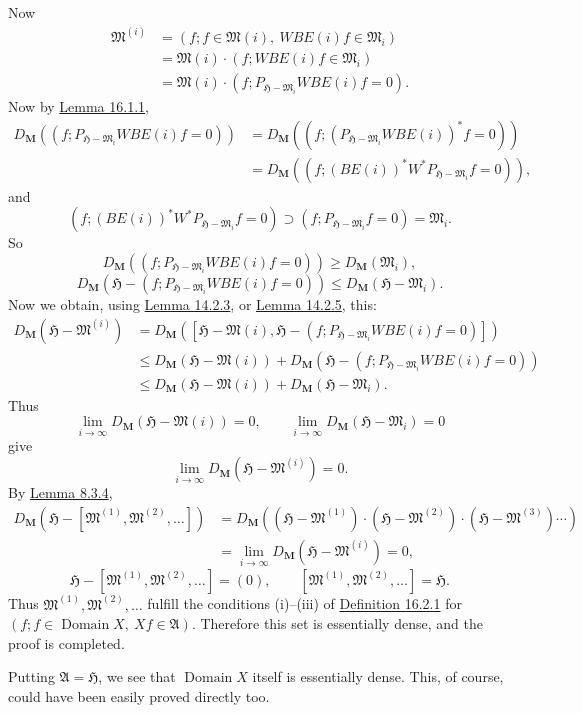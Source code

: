 \documentclass[12pt,b5paper,twoside]{article}
\newcommand{\Hspace}{\mathfrak H}
\newcommand{\M}{\mathbf M}
\newcommand{\defref}[1]{\hyperref[def:#1]{Definition #1}}
\newcommand{\lemref}[1]{\hyperref[lem:#1]{Lemma #1}}
\begin{document}
Now
\[
\begin{aligned}
\mathfrak M^{(i)}
 &=(f;f\in\mathfrak M(i),\ WBE(i)f\in\mathfrak M_i)\\
 &=\mathfrak M(i)\cdot(f;WBE(i)f\in\mathfrak M_i)\\
 &=\mathfrak M(i)\cdot
   (f;P_{\Hspace-\mathfrak M_i}WBE(i)f=0).
\end{aligned}
\]
Now by \lemref{16.1.1},
\[
\begin{aligned}
D_{\M}((f;P_{\Hspace-\mathfrak M_i}WBE(i)f=0))
 &=D_{\M}((f;(P_{\Hspace-\mathfrak M_i}WBE(i))^*f=0))\\
 &=D_{\M}((f;(BE(i))^*W^*P_{\Hspace-\mathfrak M_i}f=0)),
\end{aligned}
\]
and
\[
(f;(BE(i))^*W^*P_{\Hspace-\mathfrak M_i}f=0)
\supset(f;P_{\Hspace-\mathfrak M_i}f=0)=\mathfrak M_i.
\]
So
\[
D_{\M}((f;P_{\Hspace-\mathfrak M_i}WBE(i)f=0))
\geq D_{\M}(\mathfrak M_i),
\]
\[
D_{\M}(\Hspace-(f;P_{\Hspace-\mathfrak M_i}WBE(i)f=0))
\leq D_{\M}(\Hspace-\mathfrak M_i).
\]
Now we obtain, using \lemref{14.2.3}, or \lemref{14.2.5}, this:
\[
\begin{aligned}
D_{\M}(\Hspace-\mathfrak M^{(i)})
 &=D_{\M}([\Hspace-\mathfrak M(i),
   \Hspace-(f;P_{\Hspace-\mathfrak M_i}WBE(i)f=0)])\\
 &\leq D_{\M}(\Hspace-\mathfrak M(i))
 +D_{\M}(\Hspace-(f;P_{\Hspace-\mathfrak M_i}WBE(i)f=0))\\
 &\leq D_{\M}(\Hspace-\mathfrak M(i))
 +D_{\M}(\Hspace-\mathfrak M_i).
\end{aligned}
\]
Thus
\[
\lim_{i\to\infty}D_{\M}(\Hspace-\mathfrak M(i))=0,
\qquad
\lim_{i\to\infty}D_{\M}(\Hspace-\mathfrak M_i)=0
\]
give
\[
\lim_{i\to\infty}D_{\M}(\Hspace-\mathfrak M^{(i)})=0.
\]
By \lemref{8.3.4},
\[
\begin{aligned}
D_{\M}(\Hspace-[\mathfrak M^{(1)},\mathfrak M^{(2)},\ldots])
 &=D_{\M}((\Hspace-\mathfrak M^{(1)})
          \cdot(\Hspace-\mathfrak M^{(2)})
          \cdot(\Hspace-\mathfrak M^{(3)})\cdots)\\
 &=\lim_{i\to\infty}D_{\M}(\Hspace-\mathfrak M^{(i)})=0,
\end{aligned}
\]
\[
\Hspace-[\mathfrak M^{(1)},\mathfrak M^{(2)},\ldots]=(0),
\qquad
[\mathfrak M^{(1)},\mathfrak M^{(2)},\ldots]=\Hspace.
\]
Thus \(\mathfrak M^{(1)},\mathfrak M^{(2)},\ldots\) fulfill the conditions
(i)--(iii) of \defref{16.2.1} for
\((f;f\in\operatorname{Domain}X,\ Xf\in\mathfrak A)\). Therefore this set
is essentially dense, and the proof is completed.

Putting \(\mathfrak A=\Hspace\), we see that \(\operatorname{Domain}X\)
itself is essentially dense. This, of course, could have been easily proved
directly too.
\end{document}
